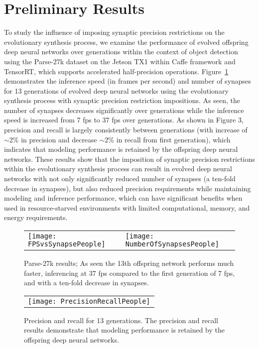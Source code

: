 \documentclass[10pt,letterpaper]{article}
\begin{document}
\section{Preliminary Results}
\vspace{-0.1 cm}
To study the influence of imposing synaptic precision restrictions on the evolutionary synthesis process, we examine the performance of evolved offspring deep neural networks over generations within the context of object detection using the Parse-27k dataset on the Jetson TX1 within Caffe framework and TensorRT, which supports accelerated half-precision operations. Figure~\ref{fig:carfps} demonstrates the inference speed (in frames per second) and number of synapses for 13 generations of evolved deep neural networks using the evolutionary synthesis process with synaptic precision restriction impositions.  As seen, the number of synapses decreases significantly over generations while the inference speed is increased from 7 fps to 37 fps over generations. As shown in Figure 3, precision and recall is largely consistently between generations (with increase of $\sim$2\% in precision and decrease $\sim$2\% in recall from first generation), which indicates that modeling performance is retained by the offspring deep neural networks.  These results show that the imposition of synaptic precision restrictions within the evolutionary synthesis process can result in evolved deep neural networks with not only significantly reduced number of synapses (a ten-fold decrease in synapses), but also reduced precision requirements while maintaining modeling and inference performance, which can have significant benefits when used in resource-starved environments with limited computational, memory, and energy requirements.
\begin{figure}[!th]
	\vspace{-0.4cm}
	\centering
	\begin{tabular}{ll}
		\texttt{[image: FPSvsSynapsePeople]}&
		\texttt{[image: NumberOfSynapsesPeople]}
		\end{tabular}
			\vspace{-0.45 cm}
	\caption{Parse-27k results; As seen the 13th offspring network performs much faster, inferencing at 37 fps compared to the first generation of 7 fps, and with a ten-fold decrease in synapses. }
	\label{fig:carfps}
	\vspace{-0.25 cm}
\end{figure}

\begin{figure}[!th]
	\centering
	\begin{tabular}{c}
		\texttt{[image: PrecisionRecallPeople]}
	\end{tabular}
	\vspace{-0.2 cm}
	\caption{Precision and recall for 13 generations. The precision and recall results demonstrate that modeling performance is retained by the offspring deep neural networks. }
	\label{fig:PeoplePrecision}
	\vspace{-0.5 cm}
\end{figure}
\vspace{-0.35 cm}
\end{document}
